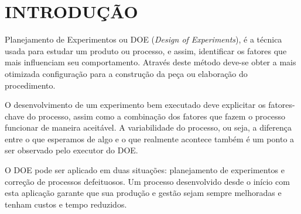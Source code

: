 \chapter{INTRODUÇÃO}
    Planejamento de Experimentos ou DOE (\textit{Design of Experiments}), é a técnica usada para estudar um produto ou processo, e assim, identificar os fatores que mais influenciam seu comportamento. Através deste método deve-se obter a mais otimizada configuração para a construção da peça ou elaboração do procedimento.

    O desenvolvimento de um experimento bem executado deve explicitar os fatores-chave do processo, assim como a combinação dos fatores que fazem o processo funcionar de maneira aceitável. A variabilidade do processo, ou seja, a diferença entre o que esperamos de algo e o que realmente acontece também é um ponto a ser observado pelo executor do DOE.

    O DOE pode ser aplicado em duas situações: planejamento de experimentos e correção de processos defeituosos. Um processo desenvolvido desde o início com esta aplicação garante que sua produção e gestão sejam sempre melhoradas e tenham custos e tempo reduzidos. 



    
    
    






